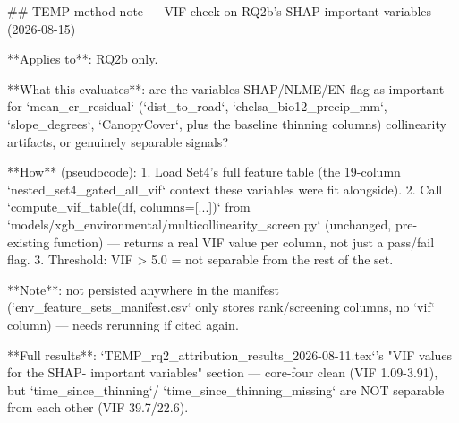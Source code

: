 ## TEMP method note — VIF check on RQ2b's SHAP-important variables (2026-08-15)

**Applies to**: RQ2b only.

**What this evaluates**: are the variables SHAP/NLME/EN flag as important for `mean_cr_residual`
(`dist_to_road`, `chelsa_bio12_precip_mm`, `slope_degrees`, `CanopyCover`, plus the baseline
thinning columns) collinearity artifacts, or genuinely separable signals?

**How** (pseudocode):
1. Load Set4's full feature table (the 19-column `nested_set4_gated_all_vif` context these
   variables were fit alongside).
2. Call `compute_vif_table(df, columns=[...])` from
   `models/xgb_environmental/multicollinearity_screen.py` (unchanged, pre-existing function) —
   returns a real VIF value per column, not just a pass/fail flag.
3. Threshold: VIF > 5.0 = not separable from the rest of the set.

**Note**: not persisted anywhere in the manifest (`env_feature_sets_manifest.csv` only stores
rank/screening columns, no `vif` column) — needs rerunning if cited again.

**Full results**: `TEMP_rq2_attribution_results_2026-08-11.tex`'s "VIF values for the SHAP-
important variables" section — core-four clean (VIF 1.09-3.91), but `time_since_thinning`/
`time_since_thinning_missing` are NOT separable from each other (VIF 39.7/22.6).
